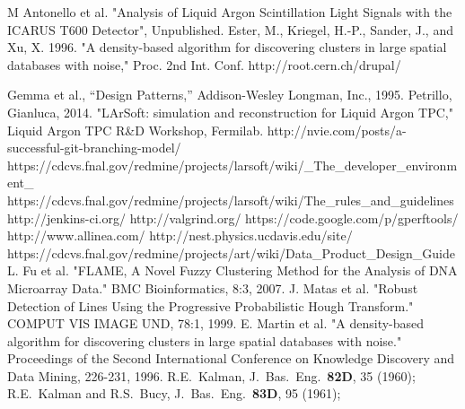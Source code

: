 \documentclass[12pt]{elsarticle}
\begin{document}
\begin{thebibliography}{99}
 M Antonello et al.  "Analysis of Liquid Argon Scintillation Light Signals with the ICARUS T600 Detector", Unpublished.
 Ester, M., Kriegel, H.-P., Sander, J., and Xu, X. 1996. "A density-based algorithm for discovering clusters in large spatial databases with noise," Proc. 2nd Int. Conf.
 http://root.cern.ch/drupal/

 Gemma et al., ``Design Patterns,'' Addison-Wesley Longman, Inc., 1995. 
 Petrillo, Gianluca, 2014. "LArSoft: simulation and reconstruction for Liquid Argon TPC," Liquid Argon TPC R\&D Workshop, Fermilab.
 http://nvie.com/posts/a-successful-git-branching-model/
 https://cdcvs.fnal.gov/redmine/projects/larsoft/wiki/\_The\_developer\_environment\_
 https://cdcvs.fnal.gov/redmine/projects/larsoft/wiki/The\_rules\_and\_guidelines
 http://jenkins-ci.org/
 http://valgrind.org/
 https://code.google.com/p/gperftools/
 http://www.allinea.com/
 http://nest.physics.ucdavis.edu/site/
 https://cdcvs.fnal.gov/redmine/projects/art/wiki/Data\_Product\_Design\_Guide
 L. Fu et al. "FLAME, A Novel Fuzzy Clustering Method for the Analysis of DNA Microarray Data." BMC Bioinformatics, 8:3, 2007.
 J. Matas et al. "Robust Detection of Lines Using the Progressive Probabilistic Hough Transform." COMPUT VIS IMAGE UND, 78:1, 1999.
 E. Martin et al. "A density-based algorithm for discovering clusters in large spatial databases with noise." Proceedings of the Second International Conference on Knowledge Discovery and Data Mining, 226-231, 1996. 
R.E.~Kalman, J.~Bas.~Eng.~{\bf 82D}, 35 (1960);
R.E.~Kalman and R.S.~Bucy, J.~Bas.~Eng.~{\bf 83D}, 95 (1961);

\end{thebibliography}
\clearpage 
\end{document}
